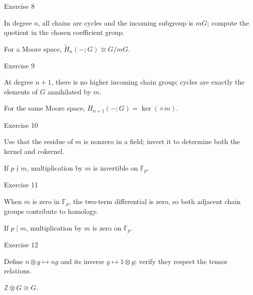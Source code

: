 \begin{exercise}\label{exr:viii25-08}
Exercise 8
\end{exercise}
\begin{hint}
In degree \(n\), all chains are cycles and the incoming subgroup is \(mG\); compute the quotient in the chosen coefficient group.
\end{hint}
\begin{solution}
For a Moore space, \(\widetilde H_n(-;G)\cong G/mG\).
\end{solution}

\begin{exercise}\label{exr:viii25-09}
Exercise 9
\end{exercise}
\begin{hint}
At degree \(n+1\), there is no higher incoming chain group; cycles are exactly the elements of \(G\) annihilated by \(m\).
\end{hint}
\begin{solution}
For the same Moore space, \(H_{n+1}(-;G)=\ker(\times m)\).
\end{solution}

\begin{exercise}\label{exr:viii25-10}
Exercise 10
\end{exercise}
\begin{hint}
Use that the residue of \(m\) is nonzero in a field; invert it to determine both the kernel and cokernel.
\end{hint}
\begin{solution}
If \(p\nmid m\), multiplication by \(m\) is invertible on \(\mathbb F_p\).
\end{solution}

\begin{exercise}\label{exr:viii25-11}
Exercise 11
\end{exercise}
\begin{hint}
When \(m\) is zero in \(\mathbb F_p\), the two-term differential is zero, so both adjacent chain groups contribute to homology.
\end{hint}
\begin{solution}
If \(p\mid m\), multiplication by \(m\) is zero on \(\mathbb F_p\).
\end{solution}

\begin{exercise}\label{exr:viii25-12}
Exercise 12
\end{exercise}
\begin{hint}
Define \(n\otimes g\mapsto ng\) and its inverse \(g\mapsto1\otimes g\); verify they respect the tensor relations.
\end{hint}
\begin{solution}
\(\mathbb Z\otimes G\cong G\).
\end{solution}

